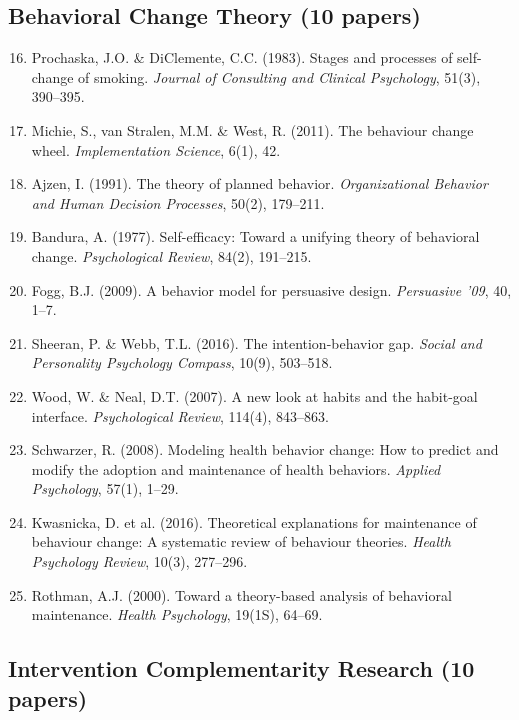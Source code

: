 \subsection{Behavioral Change Theory (10 papers)}

\begin{enumerate}
    \setcounter{enumi}{15}
    \item Prochaska, J.O. \& DiClemente, C.C. (1983). Stages and processes of self-change of smoking. \textit{Journal of Consulting and Clinical Psychology}, 51(3), 390--395.
    \item Michie, S., van Stralen, M.M. \& West, R. (2011). The behaviour change wheel. \textit{Implementation Science}, 6(1), 42.
    \item Ajzen, I. (1991). The theory of planned behavior. \textit{Organizational Behavior and Human Decision Processes}, 50(2), 179--211.
    \item Bandura, A. (1977). Self-efficacy: Toward a unifying theory of behavioral change. \textit{Psychological Review}, 84(2), 191--215.
    \item Fogg, B.J. (2009). A behavior model for persuasive design. \textit{Persuasive '09}, 40, 1--7.
    \item Sheeran, P. \& Webb, T.L. (2016). The intention-behavior gap. \textit{Social and Personality Psychology Compass}, 10(9), 503--518.
    \item Wood, W. \& Neal, D.T. (2007). A new look at habits and the habit-goal interface. \textit{Psychological Review}, 114(4), 843--863.
    \item Schwarzer, R. (2008). Modeling health behavior change: How to predict and modify the adoption and maintenance of health behaviors. \textit{Applied Psychology}, 57(1), 1--29.
    \item Kwasnicka, D. et al. (2016). Theoretical explanations for maintenance of behaviour change: A systematic review of behaviour theories. \textit{Health Psychology Review}, 10(3), 277--296.
    \item Rothman, A.J. (2000). Toward a theory-based analysis of behavioral maintenance. \textit{Health Psychology}, 19(1S), 64--69.
\end{enumerate}

\subsection{Intervention Complementarity Research (10 papers)}

